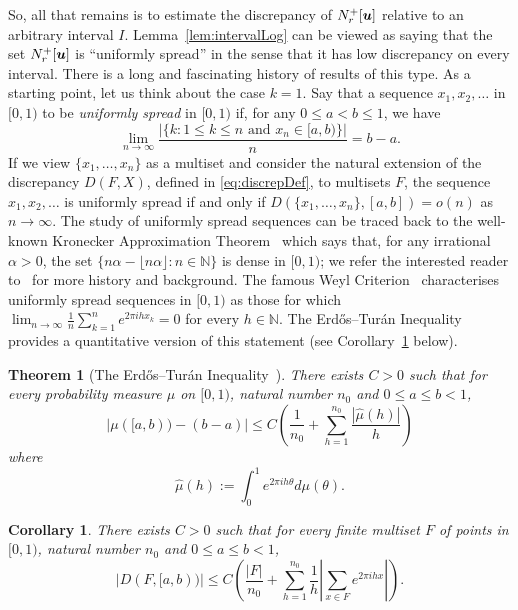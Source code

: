\documentclass[12pt,a4paper]{amsart}
\numberwithin{equation}{section}
\newtheorem{theorem}[equation]{Theorem}
\newtheorem{corollary}[equation]{Corollary}
\theoremstyle{definition}
\begin{document}
So, all that remains is to estimate the discrepancy of $N_r^+[\boldsymbol{u}]$ relative to an arbitrary interval $I$. Lemma~\ref{lem:intervalLog} can be viewed as saying that the set $N_r^+[\boldsymbol{u}]$ is ``uniformly spread'' in the sense that it has low discrepancy on every interval. There is a long and fascinating history of results of this type. As a starting point, let us think about the case $k=1$. Say that a sequence $x_1,x_2,\dots$ in $[0,1)$ to be \emph{uniformly spread} in $[0,1)$ if, for any $0\leq a< b\leq 1$, we have 
\[\lim_{n\to\infty}\frac{\left|\{k: 1\leq k\leq n\text{ and }x_n\in [a,b)\}\right|}{n} = b-a.\]
If we view $\{x_1,\dots,x_n\}$ as a multiset and consider the natural extension of the discrepancy $D(F,X)$, defined in \eqref{eq:discrepDef}, to multisets $F$, the sequence $x_1,x_2,\dots$ is uniformly spread if and only if $D(\{x_1,\dots,x_n\},[a,b])=o(n)$ as $n\to\infty$. The study of uniformly spread sequences can be traced back to the well-known Kronecker Approximation Theorem~\cite{Kronecker84} which says that, for any irrational $\alpha>0$, the set $\{n\alpha-\lfloor n\alpha\rfloor: n\in \mathbb{N}\}$ is dense in $[0,1)$; we refer the interested reader to~\cite[Chapter~1]{DrmotaTicky97} for more history and background. The famous Weyl Criterion~\cite{Weyl16} characterises uniformly spread sequences in $[0,1)$ as those for which $\lim_{n\to\infty}\frac{1}{n}\sum_{k=1}^ne^{2\pi i h x_k} = 0$ for every $h\in \mathbb{N}$. The Erd\H{o}s--Tur\'an Inequality~\cite{ErdosTuran48I,ErdosTuran48II} provides a quantitative version of this statement (see Corollary~\ref{cor:ErdosTuran} below).

\begin{theorem}[The Erd\H{o}s--Tur\'{a}n Inequality~\cite{ErdosTuran48I,ErdosTuran48II}]
\label{th:ErdosTuran}
There exists $C>0$ such that for every probability measure $\mu$ on $[0,1)$, natural number $n_0$ and $0\leq a\leq b<1$,
\[\left|\mu([a,b)) - (b-a)\right|\leq C\left(\frac{1}{n_0} + \sum_{h=1}^{n_0}\frac{|\hat{\mu}(h)|}{h}\right)\]
where
\[\hat{\mu}(h):=\int_0^1e^{2\pi i h \theta}d\mu(\theta).\]
\end{theorem}

\begin{corollary}
\label{cor:ErdosTuran}
There exists $C>0$ such that for every finite multiset $F$ of points in $[0,1)$, natural number $n_0$ and $0\leq a\leq b<1$, 
\[|D(F,[a,b))|\leq C\left(\frac{|F|}{n_0} + \sum_{h=1}^{n_0}\frac{1}{h}\left|\sum_{x\in F}e^{2\pi i hx}\right|\right).\]
\end{corollary}
\end{document}
